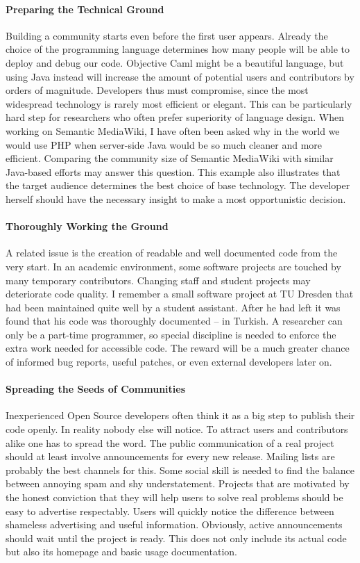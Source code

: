 \paragraph*{Preparing the Technical Ground}
Building a community starts even before the first user appears. Already the choice of the programming language determines how many people will be able to deploy and debug our code. Objective Caml might be a beautiful language, but using Java instead will increase the amount of potential users and contributors by orders of magnitude. Developers thus must compromise, since the most widespread technology is rarely most efficient or elegant. This can be particularly hard step for researchers who often prefer superiority of language design. When working on Semantic MediaWiki, I have often been asked why in the world we would use PHP when server-side Java would be so much cleaner and more efficient. Comparing the community size of Semantic MediaWiki with similar Java-based efforts may answer this question. This example also illustrates that the target audience determines the best choice of base technology. The developer herself should have the necessary insight to make a most opportunistic decision.

\paragraph*{Thoroughly Working the Ground}
A related issue is the creation of readable and well documented code from the very start. In an academic environment, some software projects are touched by many temporary contributors. Changing staff and student projects may deteriorate code quality. I remember a small software project at TU Dresden that had been maintained quite well by a student assistant. After he had left it was found that his code was thoroughly documented -- in Turkish. A researcher can only be a part-time programmer, so special discipline is needed to enforce the extra work needed for accessible code. The reward will be a much greater chance of informed bug reports, useful patches, or even external developers later on.

\paragraph*{Spreading the Seeds of Communities}
Inexperienced Open Source developers often think it as a big step to publish their code openly. In reality nobody else will notice. To attract users and contributors alike one has to spread the word. The public communication of a real project should at least involve announcements for every new release. Mailing lists are probably the best channels for this. Some social skill is needed to find the balance between annoying spam and shy understatement. Projects that are motivated by the honest conviction that they will help users to solve real problems should be easy to advertise respectably. Users will quickly notice the difference between shameless advertising and useful information. Obviously, active announcements should wait until the project is ready. This does not only include its actual code but also its homepage and basic usage documentation.

